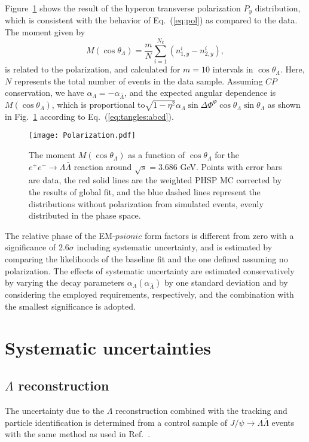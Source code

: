 \documentclass[a4paper,11pt]{article}
\begin{document}
Figure~\ref{cos} shows the result of the hyperon transverse polarization $P_{y}$ distribution,
which is consistent with the behavior of Eq.~(\ref{eq:pol}) as compared to the data. The moment given by
%
\begin{equation}\label{moment}
M(\cos\theta_{\Lambda}) = \frac{m}{N}\sum_{i=1}^{N_k}(n^{i}_{1,y} - n^{i}_{2,y}),
\end{equation}
%
is related to the polarization, and calculated for $m = 10$
intervals in $\cos\theta_{\Lambda}$. Here, $N$ represents the total number of events in the data sample. Assuming $CP$ conservation, we have $\alpha_{\Lambda} = - \alpha_{\bar\Lambda}$, 
{and the expected angular dependence is $M(\cos\theta_{\Lambda})$, which is proportional to$\sqrt{1-\eta^{2}}\alpha_{\Lambda}\!\sin\Delta\Phi^{\Psi}\cos\theta_{\Lambda}\sin\theta_{\Lambda}$ as shown in Fig.~\ref{cos} according to Eq.~(\ref{eq:tangles:abcd}). }
\begin{figure}[htbp]
\centering
\texttt{[image: Polarization.pdf]}
\caption{\small {The moment $M(\cos\theta_{\Lambda})$ as a function of $\cos\theta_{\Lambda}$ for the $e^+e^-\to\Lambda\bar\Lambda$ reaction around $\sqrt{s} = 3.686$ GeV. Points with error bars are data, the red solid lines are the weighted PHSP MC corrected by the results of global fit, and the blue dashed lines represent the distributions without polarization from simulated events, evenly distributed in the phase space.}}
\label{cos}
\end{figure}

The relative phase of the EM-$psionic$ form factors is different from zero with a significance of 2.6$\sigma$ including systematic uncertainty,
and is estimated by comparing the likelihoods of the baseline fit and the one defined assuming no polarization. 
The effects of systematic uncertainty are estimated conservatively by varying the decay parameters $\alpha_{\Lambda} (\alpha_{\bar\Lambda})$ by one standard deviation and by considering the employed requirements, respectively, and the combination with the smallest significance is adopted.


\section{Systematic uncertainties}

\subsection{$\Lambda$ reconstruction}
The uncertainty due to the $\Lambda$ reconstruction combined with the tracking and particle identification is determined from a control sample of $J/\psi\to\Lambda\bar\Lambda$ events with the same method as used in Ref.~\cite{BESIII:2021cvv}. 
\end{document}
